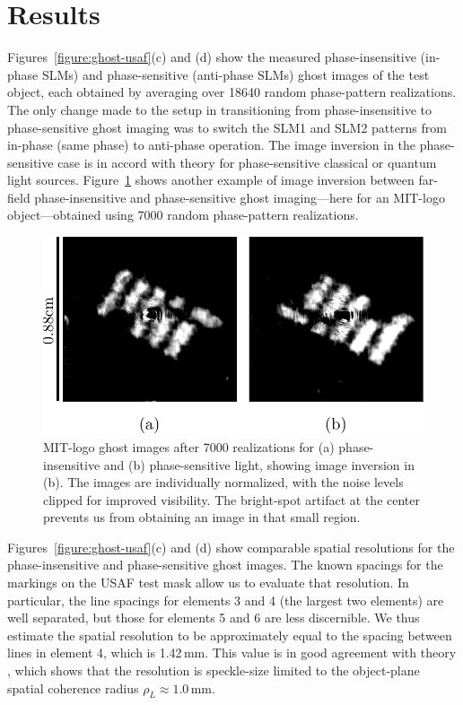 \section{Results}

Figures~\ref{figure:ghost-usaf}(c) and (d) show the measured phase-insensitive (in-phase SLMs) and phase-sensitive (anti-phase SLMs) ghost images of the test object, each obtained by averaging over 18640 random phase-pattern realizations. The only change made to the setup in transitioning from phase-insensitive to phase-sensitive ghost imaging was to switch the SLM1 and SLM2 patterns from in-phase (same phase) to anti-phase operation. The image inversion in the phase-sensitive case is in accord with theory \cite{erkmen-unified,erkmen-from} for phase-sensitive classical or quantum light sources.  Figure~\ref{figure:ghost-mitlogo} shows another example of image inversion between far-field phase-insensitive and phase-sensitive ghost imaging---here for an MIT-logo object---obtained using 7000 random phase-pattern realizations.

\begin{figure}[htb]
\centerline{\includegraphics[width=12cm]{figure-ghost-mitlogo.pdf}}
\caption{MIT-logo ghost images after 7000 realizations for (a) 
phase-insensitive and (b) phase-sensitive light, showing image inversion in (b). The images are individually normalized, with the noise levels clipped for improved visibility. The bright-spot artifact at the center prevents us from obtaining an image in that small region.}
\label{figure:ghost-mitlogo}
\end{figure}

Figures~\ref{figure:ghost-usaf}(c) and (d) show comparable spatial resolutions for the phase-insensitive and phase-sensitive ghost images. The known spacings for the markings on the USAF test mask allow us to evaluate that resolution. In particular, the line spacings for elements 3 and 4 (the largest two elements) are well separated, but those for elements 5 and 6 are less discernible. We thus estimate the spatial resolution to be approximately equal to the spacing between lines in element 4, which is 1.42\,mm. This value is in good agreement with theory \cite{erkmen-unified}, which shows that the resolution is speckle-size limited to the object-plane spatial coherence radius $\rho_L \approx 1.0$\,mm.

